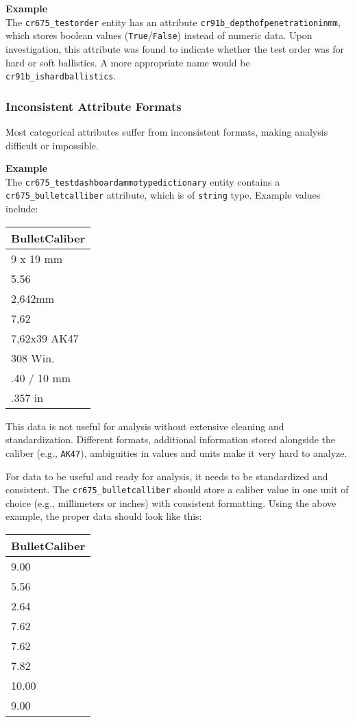 \textbf{Example}\\
The \texttt{cr675\_testorder} entity has an attribute \texttt{cr91b\_depthofpenetrationinmm}, which stores boolean values (\texttt{True}/\texttt{False}) instead of numeric data. Upon investigation, this attribute was found to indicate whether the test order was for hard or soft ballistics. A more appropriate name would be \texttt{cr91b\_ishardballistics}.

\newpage

\subsubsection{Inconsistent Attribute Formats}
Most categorical attributes suffer from inconsistent formats, making analysis difficult or impossible.

\textbf{Example}\\
The \texttt{cr675\_testdashboardammotypedictionary} entity contains a \texttt{cr675\_bulletcalliber} attribute, which is of \texttt{string} type. Example values include:

\begin{table}[h!]
	\centering
	\begin{tabular}{|l|}
	\hline
	\textbf{BulletCaliber} \\
	\hline
	9 x 19 mm \\
	5.56 \\
	2,642mm \\
	7,62 \\
	7,62x39 AK47 \\
	308 Win. \\
	.40 / 10 mm \\
	.357 in \\
	\hline
	\end{tabular}
\end{table}

This data is not useful for analysis without extensive cleaning and standardization. Different formats, additional information stored alongside the caliber (e.g., \texttt{AK47}), ambiguities in values and units make it very hard to analyze.

For data to be useful and ready for analysis, it needs to be standardized and consistent. The \texttt{cr675\_bulletcalliber} should store a caliber value in one unit of choice (e.g., millimeters or inches) with consistent formatting. Using the above example, the proper data should look like this:

\begin{table}[h!]
	\centering
	\begin{tabular}{|l|}
	\hline
	\textbf{BulletCaliber} \\
	\hline
	9.00 \\
	5.56 \\
	2.64 \\
	7.62 \\
	7.62 \\
	7.82 \\
	10.00 \\
	9.00 \\
	\hline
	\end{tabular}
\end{table}

